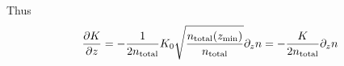 Thus
\begin{equation}
\frac{\partial K}{\partial z} = -\frac{1}{2n_\text{total}} K_0  \sqrt{\frac{n_\text{total}(z_\text{min})}{n_\text{total}}}\partial_{z}{n}
                = -\frac{K}{2n_\text{total}} \partial_{z}{n}
\label{Titan:eddy_diff_deriv}
\end{equation}
